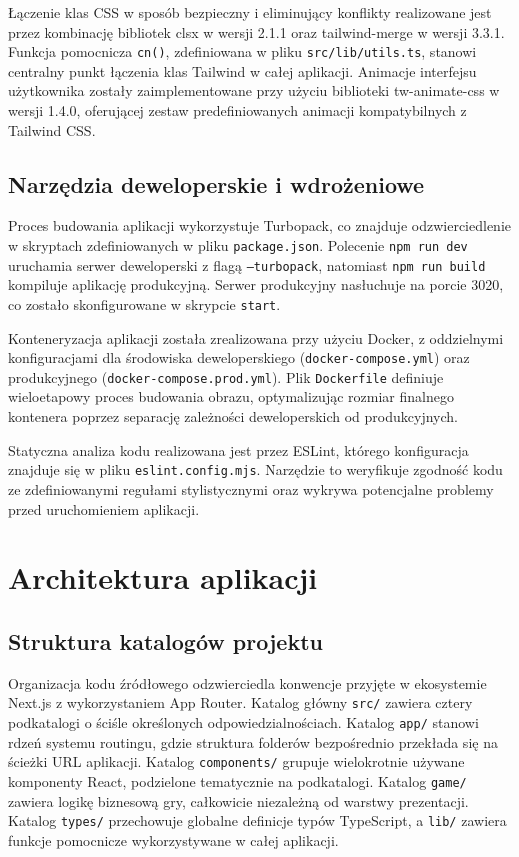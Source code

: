 \documentclass[12pt, a4paper]{article}
\begin{document}
Łączenie klas CSS w sposób bezpieczny i eliminujący konflikty realizowane jest przez kombinację bibliotek clsx w wersji 2.1.1 oraz tailwind-merge w wersji 3.3.1. Funkcja pomocnicza \texttt{cn()}, zdefiniowana w pliku \texttt{src/lib/utils.ts}, stanowi centralny punkt łączenia klas Tailwind w całej aplikacji. Animacje interfejsu użytkownika zostały zaimplementowane przy użyciu biblioteki tw-animate-css w wersji 1.4.0, oferującej zestaw predefiniowanych animacji kompatybilnych z Tailwind CSS.

\subsection{Narzędzia deweloperskie i wdrożeniowe}

Proces budowania aplikacji wykorzystuje Turbopack, co znajduje odzwierciedlenie w skryptach zdefiniowanych w pliku \texttt{package.json}. Polecenie \texttt{npm run dev} uruchamia serwer deweloperski z flagą \texttt{--turbopack}, natomiast \texttt{npm run build} kompiluje aplikację produkcyjną. Serwer produkcyjny nasłuchuje na porcie 3020, co zostało skonfigurowane w skrypcie \texttt{start}.

Konteneryzacja aplikacji została zrealizowana przy użyciu Docker, z oddzielnymi konfiguracjami dla środowiska deweloperskiego (\texttt{docker-compose.yml}) oraz produkcyjnego (\texttt{docker-compose.prod.yml}). Plik \texttt{Dockerfile} definiuje wieloetapowy proces budowania obrazu, optymalizując rozmiar finalnego kontenera poprzez separację zależności deweloperskich od produkcyjnych.

Statyczna analiza kodu realizowana jest przez ESLint, którego konfiguracja znajduje się w pliku \texttt{eslint.config.mjs}. Narzędzie to weryfikuje zgodność kodu ze zdefiniowanymi regułami stylistycznymi oraz wykrywa potencjalne problemy przed uruchomieniem aplikacji.

\section{Architektura aplikacji}

\subsection{Struktura katalogów projektu}

Organizacja kodu źródłowego odzwierciedla konwencje przyjęte w ekosystemie Next.js z wykorzystaniem App Router. Katalog główny \texttt{src/} zawiera cztery podkatalogi o ściśle określonych odpowiedzialnościach. Katalog \texttt{app/} stanowi rdzeń systemu routingu, gdzie struktura folderów bezpośrednio przekłada się na ścieżki URL aplikacji. Katalog \texttt{components/} grupuje wielokrotnie używane komponenty React, podzielone tematycznie na podkatalogi. Katalog \texttt{game/} zawiera logikę biznesową gry, całkowicie niezależną od warstwy prezentacji. Katalog \texttt{types/} przechowuje globalne definicje typów TypeScript, a \texttt{lib/} zawiera funkcje pomocnicze wykorzystywane w całej aplikacji.
\end{document}
